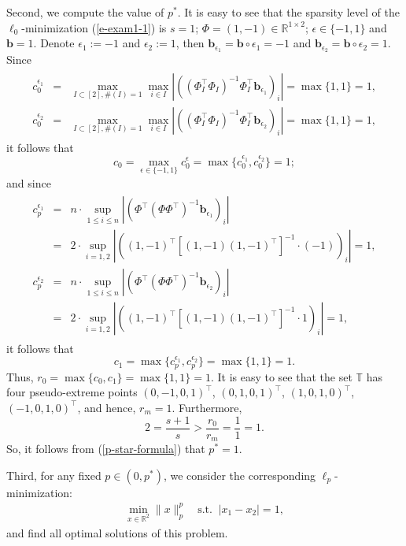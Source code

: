 \documentclass[12pt]{article}
\begin{document}
Second, we compute the value of $p^\ast$. It is easy to see that the sparsity level of the $\ell_0$-minimization (\ref{e-exam1-1}) is $s=1$; $\Phi=(1,-1)\in\mathbb{R}^{1\times2}$; $\epsilon\in\{-1,1\}$ and $\mathbf{b}=1$.
Denote $\epsilon_1:=-1$ and $\epsilon_2:=1$, then  $\mathbf{b}_{\epsilon_{1}}=\mathbf{b}\circ\epsilon_{1}=-1$ and $\mathbf{b}_{\epsilon_{2}}=\mathbf{b}\circ\epsilon_{2}=1$. Since
\begin{eqnarray*}
\begin{array}{rcl}
c^{\epsilon_1}_0&=&\max\limits_{I\subset[2],\#(I)=1}\max\limits_{i\in I}|((\Phi^{\top}_{I}\Phi_{I})^{-1}\Phi^{\top}_{I}\mathbf{b}_{\epsilon_1})_i| = \max\{1,1\}=1,\\  c^{\epsilon_2}_0&=&\max\limits_{I\subset[2],\#(I)=1}\max\limits_{i\in I}|((\Phi^{\top}_{I}\Phi_{I})^{-1}\Phi^{\top}_{I}\mathbf{b}_{\epsilon_2})_i|=\max\{1,1\}=1,
\end{array}
\end{eqnarray*}
it follows that
$$
c_0=\max\limits_{\epsilon\in\{-1,1\}}c^\epsilon_0=\max\{c^{\epsilon_1}_0,c^{\epsilon_2}_0\}=1;
$$
and since
\begin{eqnarray*}
\begin{array}{rcl}
c^{\epsilon_1}_p&=&n\cdot\sup\limits_{1\leqslant i\leqslant
n}|(\Phi^{\top}(\Phi\Phi^{\top})^{-1}\mathbf{b}_{\epsilon_1})_{i}| \\ &=&2\cdot\sup\limits_{i=1,2}|\left((1,-1)^{\top}[(1,-1)(1,-1)^{\top}]^{-1}\cdot(-1)\right)_i| =1,\\
c^{\epsilon_2}_p&=&n\cdot\sup\limits_{1\leqslant i\leqslant
n}|(\Phi^{\top}(\Phi\Phi^{\top})^{-1}\mathbf{b}_{\epsilon_2})_{i}| \\ &=&2\cdot\sup\limits_{i=1,2}|\left((1,-1)^{\top}[(1,-1)(1,-1)^{\top}]^{-1}\cdot1\right)_i| =1,
\end{array}
\end{eqnarray*}
it follows that
$$
c_1=\max\{c^{\epsilon_1}_p,c^{\epsilon_2}_p\}=\max\{1,1\}=1.
$$
Thus, $r_0=\max\{c_0,c_1\}=\max\{1,1\}=1$.
It is easy to see that the set $\mathbb{T}$ has four pseudo-extreme points $(0, -1, 0, 1)^{\top}$, $(0, 1, 0, 1)^{\top}$, $(1, 0, 1, 0)^{\top}$, $(-1, 0, 1, 0)^{\top}$, and hence, $r_m=1$. Furthermore,
$$2=\frac{s+1}{s}>\frac{r_0}{r_m}=\frac{1}{1}=1.$$
So, it follows from (\ref{p-star-formula}) that $p^\ast=1$.

Third, for any fixed $p\in (0,p^\ast)$, we consider the corresponding $\ell_p$-minimization:
\begin{eqnarray}\label{e-exam1-2}
\min\limits_{x\in \mathbb{R}^2}\| x \|_p^p\quad \textrm{s.t.}\;\; |x_1-x_2|=1,
\end{eqnarray}
and find all optimal solutions of this problem.
\end{document}
